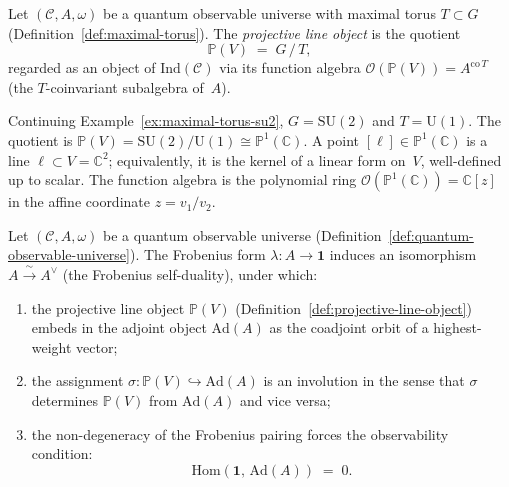 \begin{definition}
\label{def:projective-line-object}
Let $(\mathcal{C}, A, \omega)$ be a quantum observable universe with
maximal torus $T \subset G$ (Definition~\ref{def:maximal-torus}).
The \emph{projective line object} is the quotient
\[
  \mathbb{P}(V) \;=\; G \,/\, T,
\]
regarded as an object of $\mathrm{Ind}(\mathcal{C})$ via its function
algebra $\mathcal{O}(\mathbb{P}(V)) = A^{\mathrm{co}\,T}$
(the $T$-coinvariant subalgebra of~$A$).
\end{definition}

\begin{example}
\label{ex:projective-line-su2}
Continuing Example~\ref{ex:maximal-torus-su2},
$G = \mathrm{SU}(2)$ and $T = \mathrm{U}(1)$.
The quotient is
$\mathbb{P}(V) = \mathrm{SU}(2)/\mathrm{U}(1) \cong \mathbb{P}^1(\mathbb{C})$.
A point $[\ell] \in \mathbb{P}^1(\mathbb{C})$ is a line $\ell \subset V = \mathbb{C}^2$;
equivalently, it is the kernel of a linear form on~$V$, well-defined up
to scalar.  The function algebra is the polynomial ring
$\mathcal{O}(\mathbb{P}^1(\mathbb{C})) = \mathbb{C}[z]$ in the affine coordinate
$z = v_1 / v_2$.
\end{example}

\begin{proposition}
\label{prop:fiber-adjoint-involution}
Let $(\mathcal{C}, A, \omega)$ be a quantum observable universe
(Definition~\ref{def:quantum-observable-universe}).  The Frobenius form
$\lambda \colon A \to \mathbf{1}$ induces an isomorphism
$A \xrightarrow{\;\sim\;} A^{\vee}$ (the Frobenius self-duality), under
which:
\begin{enumerate}
  \item the projective line object $\mathbb{P}(V)$
        (Definition~\ref{def:projective-line-object}) embeds in the adjoint
        object $\mathrm{Ad}(A)$ as the coadjoint orbit of a highest-weight
        vector;
  \item the assignment $\sigma \colon \mathbb{P}(V) \hookrightarrow
        \mathrm{Ad}(A)$ is an involution in the sense that $\sigma$
        determines $\mathbb{P}(V)$ from $\mathrm{Ad}(A)$ and vice versa;
  \item the non-degeneracy of the Frobenius pairing forces the
        observability condition:
        \[
          \mathrm{Hom}(\mathbf{1},\, \mathrm{Ad}(A)) \;=\; 0.
        \]
\end{enumerate}
\end{proposition}

